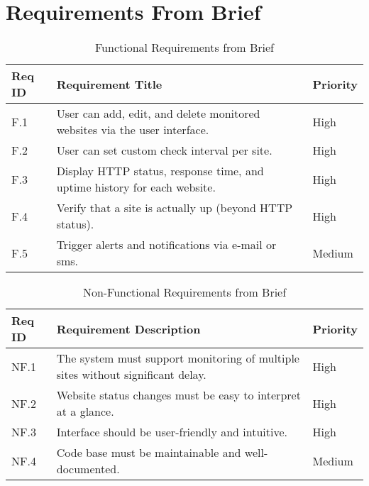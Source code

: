 \section{Requirements From Brief}
\label{app:req_from_brief}

\begin{table}[H]
\centering
\caption{Functional Requirements from Brief}
\label{tab:functional_reqs_brief}
\begin{tabular}{| l  |p{}  |l |} 
\hline
\textbf{Req ID} & \textbf{Requirement Title} & \textbf{Priority} \\
\hline
F.1 & User can add, edit, and delete monitored websites via the user interface.& High \\ \hline 
F.2 & User can set custom check interval per site.& High \\ \hline 
F.3 & Display HTTP status, response time, and uptime history for each website.& High \\ \hline 
F.4 & Verify that a site is actually up (beyond HTTP status).& High \\ \hline 
F.5 & Trigger alerts and notifications via e-mail or sms.& Medium \\ \hline

\hline
\end{tabular}
\end{table}

\begin{table}[H]
    \centering
    \caption{Non-Functional Requirements from Brief}
    \label{tab:non_functional_reqs_brief}
    \begin{tabular}{| l  |p{}  |l |}
        \hline
        \textbf{Req ID} & \textbf{Requirement Description} & \textbf{Priority} \\
        \hline
        NF.1 & The system must support monitoring of multiple sites without significant delay.& High \\ \hline 
        NF.2 & Website status changes must be easy to interpret at a glance.& High \\ \hline 
        NF.3 & Interface should be user-friendly and intuitive.& High \\ \hline 
        NF.4 & Code base must be maintainable and well-documented.& Medium \\ \hline
    \end{tabular}
\end{table}